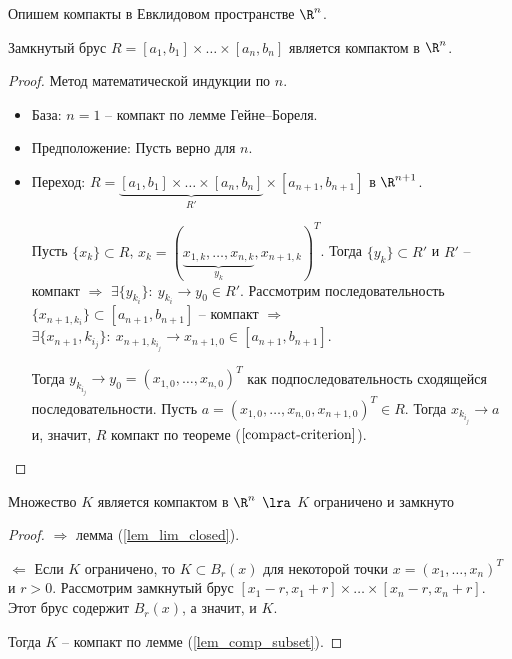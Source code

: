 
Опишем компакты в Евклидовом пространстве $\R^{n}$.

\begin{example}
    Замкнутый брус $R = [a_{1}, b_{1}] \times \ldots \times [a_{n}, b_{n}]$ является компактом в $\R^{n}$.
\end{example}

\begin{proof}
    Метод математической индукции по $n$.

    \begin{itemize}
        \item База: $n = 1$ -- компакт по лемме Гейне--Бореля.
        \item Предположение: Пусть верно для $n$.
        \item Переход: $R = \underbrace{[a_{1}, b_{1}] \times \ldots \times [a_{n}, b_{n}]}_{R'} \times [a_{n+1}, b_{n+1}]$ в $\R^{n+1}$.

        Пусть $\{x_{k}\} \subset R$, $x_{k} = (\underbrace{x_{1, k}, \ldots, x_{n, k}}_{y_{k}}, x_{n+1, k})^{T}$. Тогда $\{y_{k}\} \subset R'$ и $R'$ -- компакт $\Rightarrow$ $\exists \{y_{k_{i}}\}: \ y_{k_{i}} \to y_{0} \in R'$. Рассмотрим последовательность $\{x_{n+1, k_{i}}\} \subset [a_{n+1}, b_{n+1}]$ -- компакт $\Rightarrow$ $\exists \{x_{n+1}, k_{i_{j}}\}: \ x_{n+1, k_{i_{j}}} \to x_{n+1, 0} \in [a_{n+1}, b_{n+1}]$. 
    
        Тогда $y_{k_{i_{j}}} \to y_{0} = \left(x_{1,0}, \ldots, x_{n, 0}\right)^{T}$ как подпоследовательность сходящейся последовательности. Пусть $a = \left(x_{1,0}, \ldots, x_{n, 0}, x_{n+1, 0}\right)^{T} \in R$. Тогда $x_{k_{i_{j}}} \to a$ и, значит, $R$ компакт по теореме ($\ref{compact-criterion}$).
    \end{itemize}
\end{proof}

\begin{corollary}
    \label{criterion-compact-corollary}
    Множество $K$ является компактом в $\R^{n}$ $\lra$ $K$ ограничено и замкнуто
\end{corollary}

\begin{proof}
    $\Rightarrow$ лемма (\ref{lem_lim_closed}).

    $\Leftarrow$ Если $K$ ограничено, то $K \subset B_{r}(x)$ для некоторой точки $x = (x_{1}, \ldots, x_{n})^{T}$ и $r > 0$. Рассмотрим замкнутый брус $[x_{1} - r, x_{1} + r] \times \ldots \times [x_{n} - r, x_{n} + r]$. Этот брус содержит $B_{r}(x)$, а значит, и $K$.

    Тогда $K$ -- компакт по лемме (\ref{lem_comp_subset}).
\end{proof}


